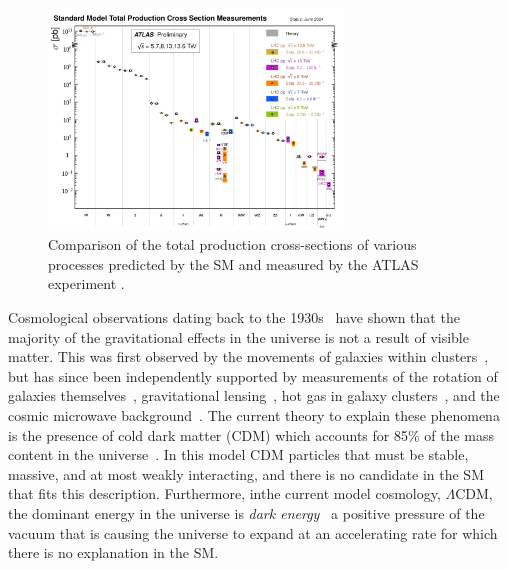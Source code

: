 \begin{figure}
	\centering
	\includegraphics[width=0.7\textwidth]{Figures/standard_model/sm_summary.pdf}
	\caption{Comparison of the total production cross-sections of various processes predicted by the SM and measured by the ATLAS experiment \cite{ATLAS:2024cgh}.}
	\label{fig:sm_precision}
\end{figure}

Cosmological observations dating back to the 1930s~\cite{GalaxyRotation} have shown that the majority of the gravitational effects in the universe is not a result of visible matter.
This was first observed by the movements of galaxies within clusters~\cite{GalaxyRotation}, but has since been independently supported by measurements of the rotation of galaxies themselves~\cite{DistributionDarkMatter, EvidenceDarkMatter,NumericalStudyStability}, gravitational lensing~\cite{GravitationalLensMagnification, Lensing1, Lensing2},
hot gas in galaxy clusters~\cite{HotGas}, and the cosmic microwave background~\cite{Planck2018Results}.
The current theory to explain these phenomena is the presence of cold dark matter (CDM) which accounts for 85\% of the mass content in the universe~\cite{Planck2018Results}.
In this model CDM particles that must be stable, massive, and at most weakly interacting, and there is no candidate in the SM that fits this description.
Furthermore, inthe current model cosmology, $\Lambda$CDM, the dominant energy in the universe is \textit{dark energy}~\cite{LCDM1, LCDM2, LCDM3, LCDM4} a positive pressure of the vacuum that is causing the universe to expand at an accelerating rate for which there is no explanation in the SM\@.

